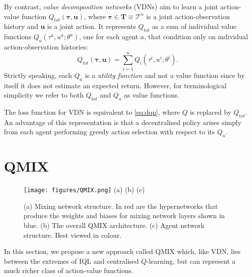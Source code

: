 \documentclass{article}
\begin{document}
By contrast, \textit{value decomposition networks} (VDNs) \citep{sunehag_value-decomposition_2017} aim to learn a joint action-value function $Q_{tot}(\boldsymbol{\tau},\mathbf{u})$, where $ \bm{\tau} \in \mathbf{T} \equiv \mathcal{T}^n $ is a joint action-observation history and $ \mathbf{u} $ is a joint action.  It represents $Q_{tot}$ as a sum of individual value functions $Q_a (\tau^a, u^a;\theta^a)$, one for each agent $a$, that condition only on individual action-observation histories:
\begin{equation}\label{eq:vdn}
Q_{tot}(\boldsymbol{\tau}, \mathbf{u}) = \sum_{i=1}^n Q_i (\tau^i, u^i;\theta^i).
\end{equation}
Strictly speaking, each $Q_a$ is a \textit{utility function} \cite{guestrin_multiagent_2002} and not a value function since by itself it does not estimate an expected return.  However, for terminological simplicity we refer to both $Q_{tot}$ and $Q_a$ as value functions.

The loss function for VDN is equivalent to \eqref{eq:dqn}, where $Q$ is replaced by $Q_{tot}$.  An advantage of this representation is that a decentralised policy arises simply from each agent performing greedy action selection with respect to its $Q_a$. 
\section{QMIX}

\begin{figure*}[h!tb]
	\centering
	\texttt{[image: figures/QMIX.png]}
	\text{~~~~~~~~~~~~~~~~~~~~~~~}(a) \hfill (b) \hfill (c) \text{~~~~~~~~~~~~~~~~~~~~}
	\caption{(a) Mixing network structure. In red are the hypernetworks that produce the weights and biases for mixing network layers shown in blue. (b) The overall QMIX architecture. (c) Agent network structure. Best viewed in colour.}
	\label{fig:QMIX}
\end{figure*}

\label{sec:methods}

In this section, we propose a new approach called QMIX which, like VDN, lies 
between the extremes of IQL and centralised $Q$-learning, but can represent a much richer class of action-value functions. 
\end{document}

